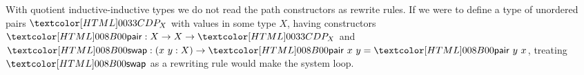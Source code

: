 With quotient inductive-inductive types we do not read the path
constructors as rewrite rules. If we were to define a type of
unordered pairs $\AgdaDatatype{P_X}$ with values in some type $X$,
having constructors
$\AgdaInductiveConstructor{\ident{pair}} : X \to X \to
\AgdaDatatype{P_X}$
and
$\AgdaInductiveConstructor{\ident{swap}} : (x\ y : X) \to
\AgdaInductiveConstructor{\ident{pair}}\ x\ y =
\AgdaInductiveConstructor{\ident{pair}}\ y\ x$,
treating $\AgdaInductiveConstructor{\ident{swap}}$ as a rewriting rule
would make the system loop.
